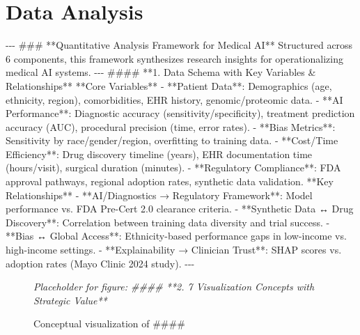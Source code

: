 \documentclass{article}%
\begin{document}
\section{Data Analysis}%
\label{sec:DataAnalysis}%
{-}{-}{-}\newline%
%
\#\#\# **Quantitative Analysis Framework for Medical AI**\newline%
%
Structured across 6 components, this framework synthesizes research insights for operationalizing medical AI systems.\newline%
%
{-}{-}{-}\newline%
%
\#\#\#\# **1. Data Schema with Key Variables \& Relationships**\newline%
%
**Core Variables**\newline%
%
{-} **Patient Data**: Demographics (age, ethnicity, region), comorbidities, EHR history, genomic/proteomic data.\newline%
%
{-} **AI Performance**: Diagnostic accuracy (sensitivity/specificity), treatment prediction accuracy (AUC), procedural precision (time, error rates).\newline%
%
{-} **Bias Metrics**: Sensitivity by race/gender/region, overfitting to training data.\newline%
%
{-} **Cost/Time Efficiency**: Drug discovery timeline (years), EHR documentation time (hours/visit), surgical duration (minutes).\newline%
%
{-} **Regulatory Compliance**: FDA approval pathways, regional adoption rates, synthetic data validation.\newline%
%
**Key Relationships**\newline%
%
{-} **AI/Diagnostics → Regulatory Framework**: Model performance vs. FDA Pre{-}Cert 2.0 clearance criteria.\newline%
%
{-} **Synthetic Data ↔ Drug Discovery**: Correlation between training data diversity and trial success.\newline%
%
{-} **Bias ↔ Global Access**: Ethnicity{-}based performance gaps in low{-}income vs. high{-}income settings.\newline%
%
{-} **Explainability → Clinician Trust**: SHAP scores vs. adoption rates (Mayo Clinic 2024 study).\newline%
%
{-}{-}{-}\newline%
%


\begin{figure}[h]%
\centering%
\textit{Placeholder for figure: #### **2. 7 Visualization Concepts with Strategic Value**}%
\caption{Conceptual visualization of \#\#\#\#}%
\end{figure}
\end{document}

